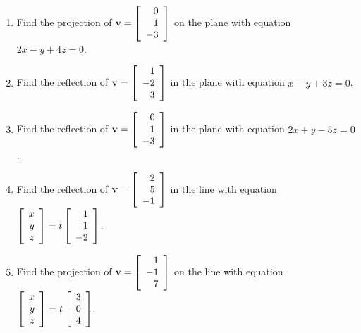\begin{multicols}{2}
\begin{ex}
\begin{enumerate}[label={\alph*.}]
\item Find the projection of 
$\textbf{v} = \left[
\begin{array}{r}
0\\
1\\
-3 
\end{array}
\right]$
 on the plane with equation $2x - y + 4z = 0$.

\item Find the reflection of 
$\textbf{v} = \left[
\begin{array}{r}
1\\
-2\\
3 
\end{array}
\right]$
 in the plane with equation $x - y + 3z = 0$.

\item Find the reflection of 
$\textbf{v} = \left[
\begin{array}{r}
0\\
1\\
-3 
\end{array}
\right]$
 in the plane with equation $2x + y -5z = 0$.

\item Find the reflection of 
$\textbf{v} = \left[
\begin{array}{r}
2\\
5\\
-1 
\end{array}
\right]$
in the line with equation 
$\left[
\begin{array}{r}
x\\
y\\
z 
\end{array}
\right]
= t
\left[
\begin{array}{r}
1\\
1\\
-2 
\end{array}
\right]$.

\item Find the projection of 
$\textbf{v} = \left[
\begin{array}{r}
1\\
-1\\
7 
\end{array}
\right]$
 on the line with equation $\left[
 \begin{array}{r}
 x\\
 y\\
 z 
 \end{array}
 \right]
 = t
 \left[
 \begin{array}{r}
 3\\
 0\\
 4 
 \end{array}
 \right]$.


\end{enumerate}
\end{ex}
\end{multicols}
